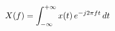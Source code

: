 \documentclass[preview]{standalone}
\begin{document}
\begin{align*}
\special{dvisvgm:raw <g id='unique000'>}X(f) = \int_{-\infty}^{+\infty} x(t)\, e^{-j2\pi f t}\, dt\special{dvisvgm:raw </g>}
\end{align*}
\end{document}
